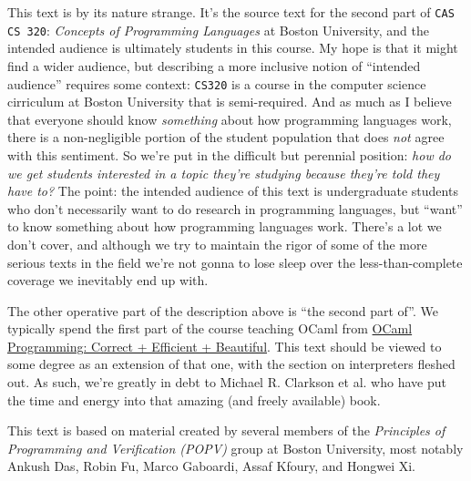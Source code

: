 This text is by its nature strange.
It's the source text for the second part of \texttt{CAS CS 320}: \textit{Concepts of Programming Languages} at Boston University, and the intended audience is ultimately students in this course.
My hope is that it might find a wider audience, but describing a more inclusive notion of \enquote{intended audience} requires some context: \texttt{CS320} is a course in the computer science cirriculum at Boston University that is semi-required.
And as much as I believe that everyone should know \textit{something} about how programming languages work, there is a non-negligible portion of the student population that does \textit{not} agree with this sentiment.
So we're put in the difficult but perennial position: \textit{how do we get students interested in a topic they're studying because they're told they have to?}
The point: the intended audience of this text is undergraduate students who don't necessarily want to do research in programming languages, but \enquote{want} to know something about how programming languages work.
There's a lot we don't cover, and although we try to maintain the rigor of some of the more serious texts in the field \cite{scott2000programming, pierce2002types, harper2016practical, ramsey2022programming} we're not gonna to lose sleep over the less-than-complete coverage we inevitably end up with.

The other operative part of the description above is \enquote{the second part of}.
We typically spend the first part of the course teaching OCaml from \href{https://cs3110.github.io/textbook/cover.html}{OCaml Programming: Correct + Efficient + Beautiful}.
This text should be viewed to some degree as an extension of that one, with the section on interpreters fleshed out.
As such, we're greatly in debt to Michael R. Clarkson et al. who have put the time and energy into that amazing (and freely available) book.

This text is based on material created by several members of the \textit{Principles of Programming and Verification (POPV)} group at Boston University, most notably Ankush Das, Robin Fu, Marco Gaboardi, Assaf Kfoury, and Hongwei Xi.
